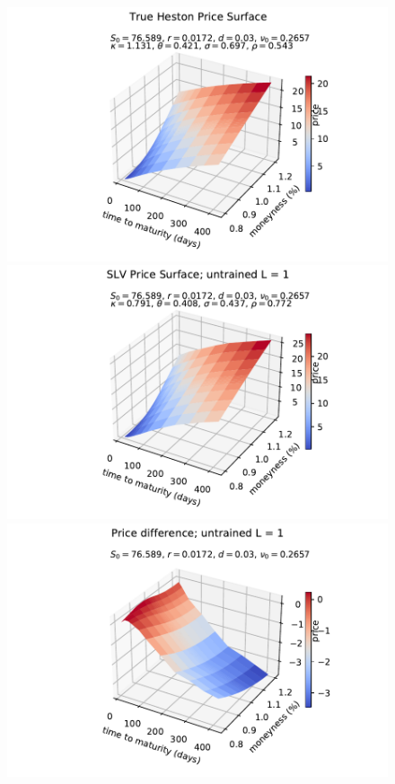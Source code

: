 \documentclass[
a4paper,     %
12pt           %
]{scrartcl}  %
\numberwithin{equation}{section}
\begin{document}
\begin{figure}
\begin{minipage}[Ausrichtung]{0.329\textwidth}
	\end{minipage}
	\begin{minipage}[Ausrichtung]{0.329\textwidth}
		\includegraphics[width=\textwidth]{fig/Psurf_orginal_2017-01-03}
	\end{minipage}
	\begin{minipage}[Ausrichtung]{0.329\textwidth}
		\includegraphics[width=\textwidth]{fig/Psurf_untrained_2017-01-03}
	\end{minipage}
	\begin{minipage}[Ausrichtung]{0.329\textwidth}
		\includegraphics[width=\textwidth]{fig/Psurf_untrained_diff_2017-01-03_rec_3lay_seed1}

\end{minipage}
\end{figure}
\end{document}
